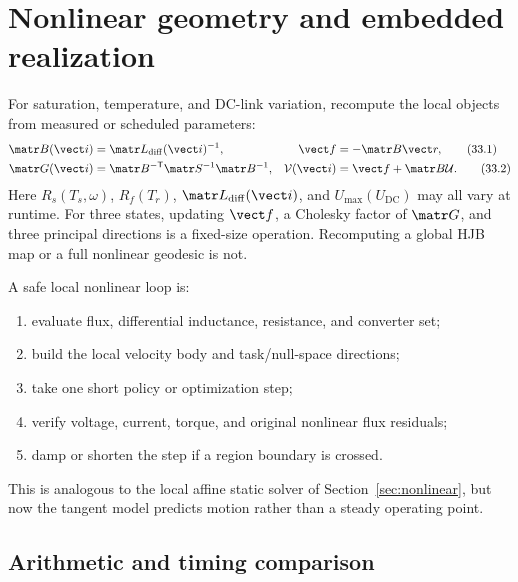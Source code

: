\section{Nonlinear geometry and embedded realization}
\label{sec:nonlinear-dynamic-embedded}

For saturation, temperature, and DC-link variation, recompute the local
objects from measured or scheduled parameters:
\begin{align}
 \matr B(\vect i)&=\matr L_{\mathrm{diff}}(\vect i)^{-1},
 &\vect f&=-\matr B\vect r,
 \tag{33.1}\\
 \matr G(\vect i)&=\matr B^{-\mathsf T}\matr S^{-1}\matr B^{-1},
 &\mathcal V(\vect i)&=\vect f+\matr B\mathcal U.
 \tag{33.2}
\end{align}
Here \(R_s(T_s,\omega)\), \(R_f(T_r)\),
\(\matr L_{\mathrm{diff}}(\vect i)\), and
\(U_{\max}(U_{\mathrm{DC}})\) may all vary at runtime.  For three states,
updating \(\vect f\), a Cholesky factor of \(\matr G\), and three principal
directions is a fixed-size operation.  Recomputing a global HJB map or a full
nonlinear geodesic is not.

A safe local nonlinear loop is:
\begin{enumerate}
 \item evaluate flux, differential inductance, resistance, and converter set;
 \item build the local velocity body and task/null-space directions;
 \item take one short policy or optimization step;
 \item verify voltage, current, torque, and original nonlinear flux residuals;
 \item damp or shorten the step if a region boundary is crossed.
\end{enumerate}
This is analogous to the local affine static solver of
Section~\ref{sec:nonlinear}, but now the tangent model predicts
motion rather than a steady operating point.

\subsection{Arithmetic and timing comparison}

